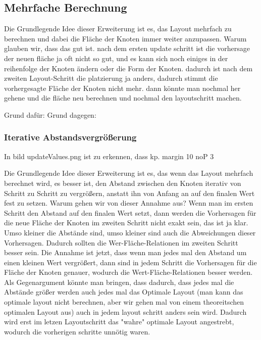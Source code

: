 
\subsection{Mehrfache Berechnung} \label{sec:MehrfacheBerechnung}
Die Grundlegende Idee dieser Erweiterung ist es, das Layout mehrfach zu berechnen und dabei die Fläche der Knoten immer weiter anzupassen. 
Warum glauben wir, dass das gut ist. nach dem ersten update schritt ist die vorhersage der neuen fläche ja oft nicht so gut, und es kann sich noch einiges in der reihenfolge der Knoten ändern oder die Form der Knoten. dadurch ist nach dem zweiten Layout-Schritt die platzierung ja anders, dadurch stimmt die vorhergesagte Fläche der Knoten nicht mehr. dann könnte man nochmal her gehene und die fläche neu berechnen und nochmal den layoutschritt machen. 

Grund dafür:
Grund dagegen: 

\subsubsection{Iterative Abstandsvergrößerung} \label{sec:IterativeAbstandsvergrößerung}
In bild updateValues.png ist zu erkennen, dass kp. margin 10 noP 3

Die Grundlegende Idee dieser Erweiterung ist es, das wenn das Layout mehrfach berechnet wird, es besser ist, den Abstand zwischen den Knoten iterativ von Schritt zu Schritt zu vergrößern, anstatt ihn von Anfang an auf den finalen Wert fest zu setzen. 
Warum gehen wir von dieser Annahme aus? 
Wenn man im ersten Schritt den Abstand auf den finalen Wert setzt, dann werden die Vorhersagen für die neue Fläche der Knoten im zweiten Schritt nicht exakt sein, das ist ja klar. Umso kleiner die Abstände sind, umso kleiner sind auch die Abweichungen dieser Vorhersagen. Dadurch sollten die Wer-Fläche-Relationen im zweiten Schritt besser sein. 
Die Annahme ist jetzt, dass wenn man jedes mal den Abstand um einen kleinen Wert vergrößert, dann sind in jedem Schritt die Vorhersagen für die Fläche der Knoten genauer, wodurch die Wert-Fläche-Relationen besser werden. Als Gegenargument könnte man bringen, dass dadurch, dass jedes mal die Abstände größer werden auch jedes mal das Optimale Layout (man kann das optimale layout nicht berechnen, aber wir gehen mal von einem theoreitschen optimalen Layout aus) auch in jedem layout schritt anders sein wird. Dadurch wird erst im letzen Layoutschritt das "wahre" optimale Layout angestrebt, wodurch die vorherigen schritte unnötig waren.

